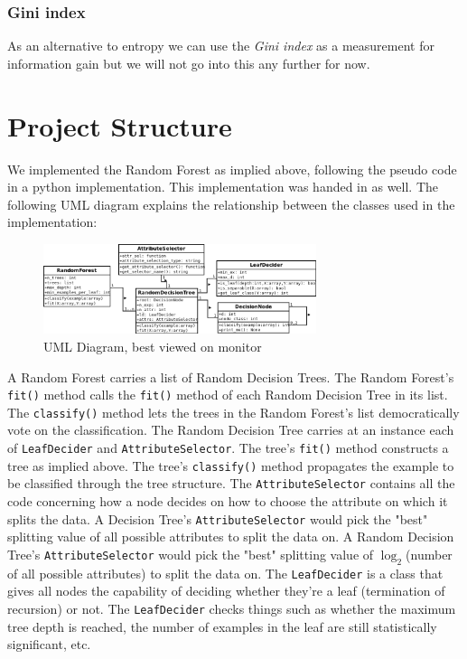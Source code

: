 \documentclass[journal, a4paper]{IEEEtran}
\begin{document}
 
\subsubsection{Gini index}
As an alternative to entropy we can use the \textit{Gini index} as a measurement for information gain but we will not go into this any further for now. 

\section{Project Structure}

We implemented the Random Forest as implied above, following the pseudo code in a python implementation. This implementation was handed in as well. The following UML diagram explains the relationship between the classes used in the implementation:


\begin{figure}[!ht]
	\centering
  \includegraphics[width=8cm]{Diagram1.png}
	\caption{UML Diagram, best viewed on monitor}
	\label{UML}
\end{figure}

A Random Forest carries a list of Random Decision Trees. The Random Forest's {\tt fit()} method calls the {\tt fit()} method of each Random Decision Tree in its list. The {\tt classify()} method lets the trees in the Random Forest's list democratically vote on the classification.\newline
The Random Decision Tree carries at an instance each of {\tt LeafDecider} and {\tt AttributeSelector}. The tree's {\tt fit()} method constructs a tree as implied above. The tree's {\tt classify()} method propagates the example to be classified through the tree structure.\newline
The {\tt AttributeSelector} contains all the code concerning how a node decides on how to choose the attribute on which it splits the data. A Decision Tree's {\tt AttributeSelector} would pick the "best" splitting value of all possible attributes to split the data on. A Random Decision Tree's {\tt AttributeSelector} would pick the "best" splitting value of \( \log_{2} \)(number of all possible attributes) to split the data on.
The {\tt LeafDecider} is a class that gives all nodes the capability of deciding whether they're a leaf (termination of recursion) or not. The {\tt LeafDecider} checks things such as whether the maximum tree depth is reached, the number of examples in the leaf are still statistically significant, etc.
\end{document}
